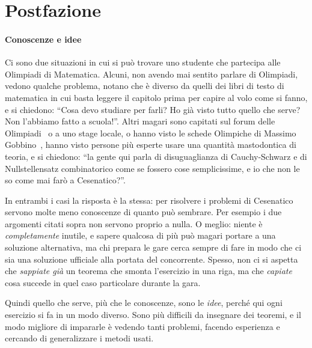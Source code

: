 \documentclass[a4paper,10pt]{paper}
\begin{document}
\section{Postfazione}
 
\paragraph{Conoscenze e idee} Ci sono due situazioni in cui si può trovare uno studente che partecipa alle Olimpiadi di Matematica. Alcuni, non avendo mai sentito parlare di Olimpiadi, vedono qualche problema, notano che è diverso da quelli dei libri di testo di matematica in cui basta leggere il capitolo prima per capire al volo come si fanno, e si chiedono: ``Cosa devo studiare per farli? Ho già visto tutto quello che serve? Non l'abbiamo fatto a scuola!''. Altri magari sono capitati sul forum delle Olimpiadi~\cite{oliforum} o a uno stage locale, o hanno visto le schede Olimpiche di Massimo Gobbino~\cite{schedeolimpiche}, hanno visto persone più esperte usare una quantità mastodontica di teoria, e si chiedono: ``la gente qui parla di disuguaglianza di Cauchy-Schwarz e di Nullstellensatz combinatorico come se fossero cose semplicissime, e io che non le so come mai farò  a Cesenatico?''.
 
 In entrambi i casi la risposta è la stessa: per risolvere i problemi di Cesenatico servono molte meno conoscenze di quanto può sembrare. Per esempio i due argomenti citati sopra non servono proprio a nulla. O meglio: niente è \emph{completamente} inutile, e sapere qualcosa di più può magari portare a una soluzione alternativa, ma chi prepara le gare cerca sempre di fare in modo che ci sia una soluzione ufficiale alla portata del concorrente. Spesso, non ci si aspetta che \emph{sappiate già} un teorema che smonta l'esercizio in una riga, ma che \emph{capiate} cosa succede in quel caso particolare durante la gara.
 
 Quindi quello che serve, più che le conoscenze, sono le \emph{idee}, perché qui ogni esercizio si fa in un modo diverso. Sono più difficili da insegnare dei teoremi, e il modo migliore di impararle è vedendo tanti problemi, facendo esperienza e cercando di generalizzare i metodi usati. 
 
\end{document}
